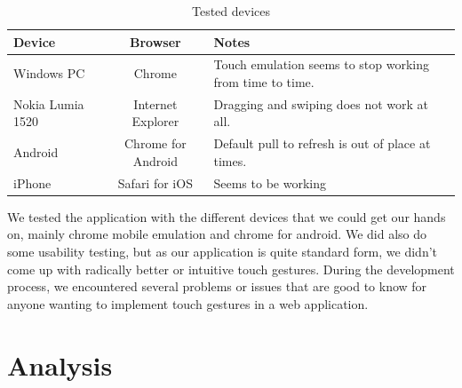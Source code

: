 \documentclass[conference]{IEEEtran}
\begin{document}
\begin{table}[htbp]
    \centering
    \begin{tabular}{| l | c | p{4cm} |}
        \hline
        Device & Browser & Notes \\ \hline
        Windows PC & Chrome & Touch emulation seems to stop working from time to time. \\ \hline
        Nokia Lumia 1520 & Internet Explorer & Dragging and swiping does not work at all. \\ \hline
        Android & Chrome for Android & Default pull to refresh is out of place at times. \\ \hline
        iPhone & Safari for iOS & Seems to be working \\ \hline
        
        
    \end{tabular}
    \caption{Tested devices}
    \label{tab:devices}
\end{table}

We tested the application with the different devices that we could get our hands on, mainly chrome mobile emulation and chrome for android. We did also do some usability testing, but as our application is quite standard form, we didn't come up with radically better or intuitive touch gestures. During the development process, we encountered several problems or issues that are good to know for anyone wanting to implement touch gestures in a web application. 




\section{Analysis}
\end{document}
